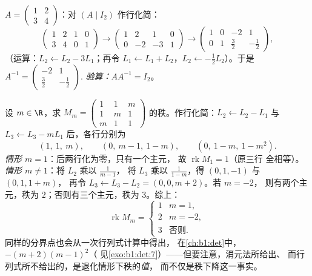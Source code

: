 \begin{example}\label{ex:b1:matrices:inverse}
$A = \begin{pmatrix} 1 & 2 \\ 3 & 4 \end{pmatrix}$：对 $(A \mid
I_2)$ 作行化简：
\[
\begin{pmatrix} 1 & 2 & 1 & 0\\ 3 & 4 & 0 & 1 \end{pmatrix}
\to
\begin{pmatrix} 1 & 2 & 1 & 0\\ 0 & -2 & -3 & 1 \end{pmatrix}
\to
\begin{pmatrix} 1 & 0 & -2 & 1\\ 0 & 1 & \tfrac32 & -\tfrac12
\end{pmatrix},
\]
（运算：$L_2 \leftarrow L_2 - 3L_1$；再令 $L_1 \leftarrow L_1
+ L_2$，$L_2 \leftarrow -\frac12 L_2$）。于是 $A^{-1} =
\begin{pmatrix} -2 & 1 \\ \tfrac32 & -\tfrac12\end{pmatrix}$.
\emph{验算：}$AA^{-1} = I_2$。
\end{example}

\begin{example}
\label{ex:b1:matrices:rankparameter}
设 $m \in \R$，求
$M_m = \begin{pmatrix} 1 & 1 & m\\ 1 & m & 1\\ m & 1 &
1\end{pmatrix}$ 的秩。作行化简：$L_2 \leftarrow L_2 - L_1$ 与 $L_3
\leftarrow L_3 - mL_1$ 后，各行分别为
\[
(1,\ 1,\ m), \qquad (0,\ m - 1,\ 1 - m), \qquad
(0,\ 1 - m,\ 1 - m^2).
\]
\emph{情形 $m = 1$}：后两行化为零，只有一个主元，
故 $\operatorname{rk} M_1 = 1$（原三行
全相等）。\emph{情形 $m \neq 1$}：将 $L_2$ 乘以 $\frac1{m-1}$，
将 $L_3$ 乘以 $\frac1{1-m}$，得 $(0, 1, -1)$ 与 $(0, 1, 1 + m)$，
再令 $L_3 \leftarrow L_3 - L_2 = (0, 0, m + 2)$。若 $m = -2$，
则有两个主元，秩为 $2$；否则有三个主元，秩为 $3$。综上：
\[
\operatorname{rk} M_m =
\begin{cases}
1 & m = 1,\\
2 & m = -2,\\
3 & \text{否则}.
\end{cases}
\]
同样的分界点也会从一次行列式计算中得出，
在\cref{ch:b1:det}中， $-(m+2)(m-1)^2$（
见\cref{exo:b1:det:7}）——但要注意，消元法所给出、
而行列式所不给出的，是退化情形下秩的\emph{值}，
而不仅是秩下降这一事实。
\end{example}

